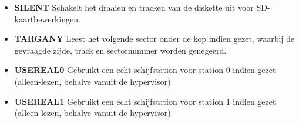 \begin{itemize}
\item{\bf{SILENT}} Schakelt het draaien en tracken van de diskette uit voor SD-kaartbewerkingen.
\item{\bf{TARGANY}} Leest het volgende sector onder de kop indien gezet, waarbij de gevraagde zijde, track en sectornummer worden genegeerd.
\item{\bf{USEREAL0}} Gebruikt een echt schijfstation voor station 0 indien gezet (alleen-lezen, behalve vanuit de hypervisor)
\item{\bf{USEREAL1}} Gebruikt een echt schijfstation voor station 1 indien gezet (alleen-lezen, behalve vanuit de hypervisor)
\end{itemize}

